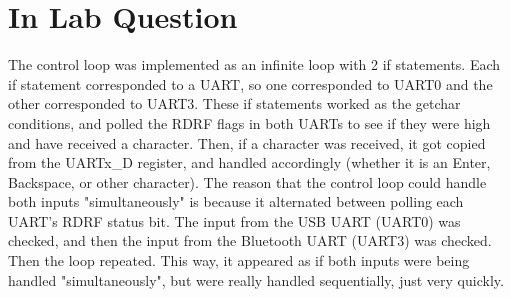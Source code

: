 \documentclass[CMPE]{KGCOEReport}
\begin{document}
\section*{In Lab Question}
The control loop was implemented as an infinite loop with 2 if statements. Each if statement corresponded to a UART, so one corresponded to UART0 and the other corresponded to UART3. These if statements worked as the getchar conditions, and polled the RDRF flags in both UARTs to see if they were high and have received a character. Then, if a character was received, it got copied from the UARTx\_D register, and handled accordingly (whether it is an Enter, Backspace, or other character). The reason that the control loop could handle both inputs "simultaneously" is because it alternated between polling each UART's RDRF status bit. The input from the USB UART (UART0) was checked, and then the input from the Bluetooth UART (UART3) was checked. Then the loop repeated. This way, it appeared as if both inputs were being handled "simultaneously", but were really handled sequentially, just very quickly. 


\newpage

\end{document}
